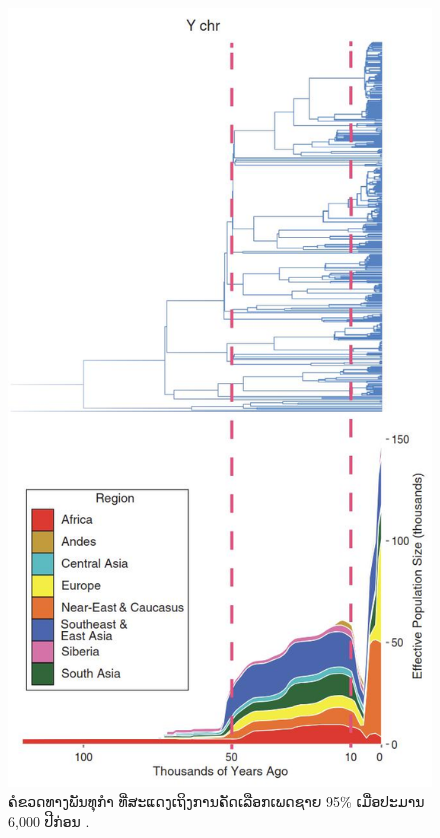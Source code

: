 \documentclass[10pt,twocolumn,letterpaper]{article}
\begin{document}
\begin{figure}[t]
\begin{center}
   \includegraphics[width=1\linewidth]{bottleneck.jpg}
\end{center}
   \caption{ຄໍຂວດທາງພັນທຸກຳ ທີ່ສະແດງເຖິງການຄັດເລືອກເພດຊາຍ 95\% ເມື່ອປະມານ 6,000 ປີກ່ອນ \cite{62}.}
\label{fig:10}
\label{fig:onecol}
\end{figure}
\end{document}
